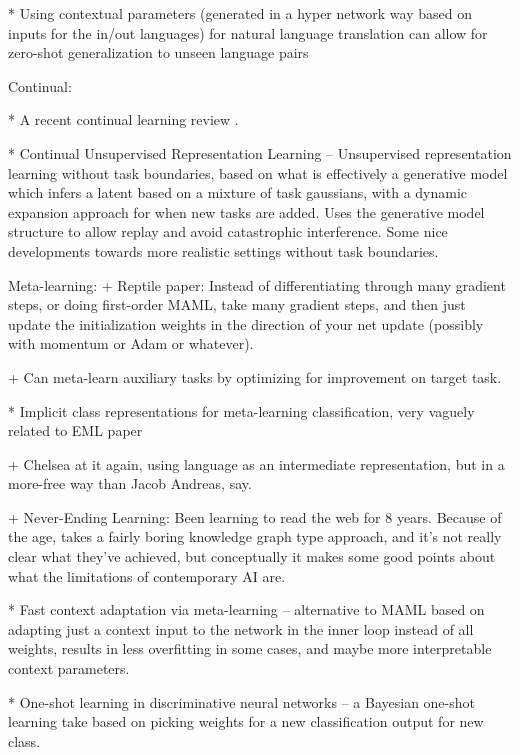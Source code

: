 * Using contextual parameters (generated in a hyper network way based on inputs for the in/out languages) for natural language translation can allow for zero-shot generalization to unseen language pairs \citep{Platanios2017}




Continual:

* A recent continual learning review \citep{Parisi2019}.

* Continual Unsupervised Representation Learning -- Unsupervised representation learning without task boundaries, based on what is effectively a generative model which infers a latent based on a mixture of task gaussians, with a dynamic expansion approach for when new tasks are added. Uses the generative model structure to allow replay and avoid catastrophic interference. Some nice developments towards more realistic settings without task boundaries. \citep{Rao2019}



Meta-learning:
+ Reptile paper: Instead of differentiating through many gradient steps, or doing first-order MAML, take many gradient steps, and then just update the initialization weights in the direction of your net update (possibly with momentum or Adam or whatever). \citep{Nichol2018} 

+ Can meta-learn auxiliary tasks by optimizing for improvement on target task. \citep{Liu2019a}

* Implicit class representations for meta-learning classification, very vaguely related to EML paper \citep{Ravichandran2019}

+ Chelsea at it again, using language as an intermediate representation, but in a more-free way than Jacob Andreas, say. \citep{Jiang2019}

+ Never-Ending Learning: Been learning to read the web for 8 years. Because of the age, takes a fairly boring knowledge graph type approach, and it's not really clear what they've achieved, but conceptually it makes some good points about what the limitations of contemporary AI are. \citep{Mitchell2018}

* Fast context adaptation via meta-learning -- alternative to MAML based on adapting just a context input to the network in the inner loop instead of all weights, results in less overfitting in some cases, and maybe more interpretable context parameters. \citep{Zintgraf2018}

* One-shot learning in discriminative neural networks -- a Bayesian one-shot learning take based on picking weights for a new classification output for new class. \citep{Burgess2016}

